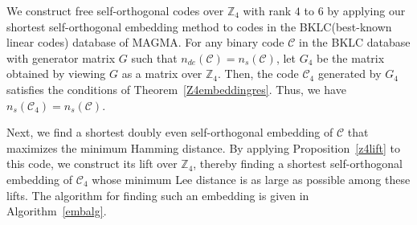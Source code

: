 \documentclass{article}
\theoremstyle{definition}
\theoremstyle{remark}
\begin{document}
We construct free self-orthogonal codes over $\mathbb{Z}_4$ with rank $4$ to $6$ by applying our shortest self-orthogonal embedding method to codes in the BKLC(best-known linear codes) database of MAGMA. For any binary code $\mathcal{C}$ in the BKLC database with generator matrix $G$ such that $n_{de}(\mathcal{C})=n_s(\mathcal{C})$, let $G_4$ be the matrix obtained by viewing $G$ as a matrix over $\mathbb{Z}_4$. Then, the code $\mathcal{C}_4$ generated by $G_4$ satisfies the conditions of Theorem~\ref{Z4embeddingres}. Thus, we have $n_s(\mathcal{C}_4)=n_{s}(\mathcal{C})$.

Next, we find a shortest doubly even self-orthogonal embedding of $\mathcal{C}$ that maximizes the minimum Hamming distance. By applying Proposition~\ref{z4lift} to this code, we construct its lift over $\mathbb{Z}_4$, thereby finding a shortest self-orthogonal embedding of $\mathcal{C}_4$ whose minimum Lee distance is as large as possible among these lifts. The algorithm for finding such an embedding is given in Algorithm~\ref{embalg}.
\end{document}
